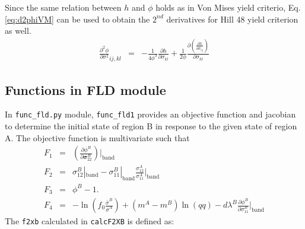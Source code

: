 \documentclass[12pt]{amsart}
\begin{document}
Since the same relation between $h$ and $\phi$ holds as in Von Mises yield criterio, Eq. \ref{eq:d2phiVM} can be used to obtain the $2^{nd}$ derivatives for Hill 48 yield criterion as well.
\begin{eqnarray}
  \label{eq:d2phiHill}
  \frac{\partial^2\phi}{\partial\sigma^2}_{ij,kl}&=& - \frac{1}{4\phi^3} \frac{\partial h}{\partial\sigma_{kl}}  + \frac{1}{2\phi}  \frac{\partial(  \frac{\partial h}{\partial \sigma_{ij}}   )}{\partial\sigma_{kl}}
\end{eqnarray}

\subsection{Functions in FLD module}
In \verb|func_fld.py| module, \verb|func_fld1| provides an objective function and jacobian to determine the initial state of region B in response to the given state of region A.
The objective function is multivariate such that
\begin{eqnarray}
  \label{eq:objf_func_fld1}
  F_1&=& (\frac{\partial \phi^B}{\partial \boldsymbol{\sigma}^B_{22}})|_\text{band}\\
  F_2&=& \sigma_{12}^B|_\text{band}- \sigma_{11}^B|_\text{band} \frac{\sigma_{12}^A}{\sigma_{11}^A}|_\text{band}\nonumber\\
  F_3&=& \phi^B- 1. \nonumber\\
  F_4&=& -\ln(f_0 \frac{\bar{\sigma}^B}{\bar{\sigma}^A}) + (m^A-m^B) \ln(qq) - d\lambda^B \frac{\partial \phi^B}{\partial \sigma^B_{11}}|_\text{band}\nonumber
\end{eqnarray}
The \verb|f2xb| calculated in \verb|calcF2XB| is defined as:
\end{document}
